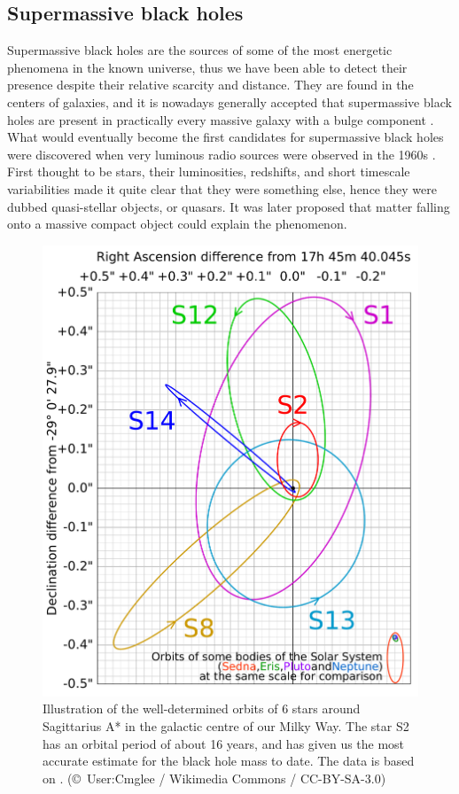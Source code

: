 \documentclass[english, oneside]{HYgradu}
\begin{document}
\subsection{Supermassive black holes}

Supermassive black holes are the sources of some of the most energetic phenomena in the known universe, thus we have been able to detect their presence despite their relative scarcity and distance. They are found in the centers of galaxies, and it is nowadays generally accepted that supermassive black holes are present in practically every massive galaxy with a bulge component \citep{kormendy:2013}. What would eventually become the first candidates for supermassive black holes were discovered when very luminous radio sources were observed in the 1960s \citep{greenstein:1964}. First thought to be stars, their luminosities, redshifts, and short timescale variabilities made it quite clear that they were something else, hence they were dubbed quasi-stellar objects, or quasars. It was later proposed that matter falling onto a massive compact object could explain the phenomenon.

\begin{figure}[h!tb]
\centering
\includegraphics[width=\textwidth]{../images/MilkyWaySMBH.pdf}
\caption{Illustration of the well-determined orbits of 6 stars around Sagittarius A* in the galactic centre of our Milky Way. The star S2 has an orbital period of about 16 years, and has given us the most accurate estimate for the black hole mass to date. The data is based on \cite{eisenhauer:2005}.
(\copyright \ User:Cmglee / Wikimedia Commons / CC-BY-SA-3.0)}
\label{fig:MilkyWayBH}
\end{figure}
\end{document}
